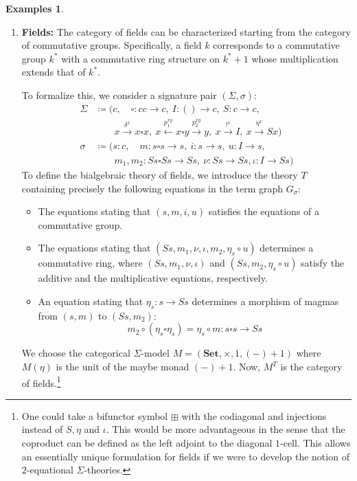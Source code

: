 \documentclass[11pt]{article}
\theoremstyle{plain}
\theoremstyle{definition}
\newtheorem{examples}[theorem]{Examples}
\numberwithin{equation}{section}
\newcommand{\Set}{\mathbf{Set}}
\begin{document}
\begin{examples}
\begin{enumerate}
\item \textbf{Fields:}
    The category of fields can be characterized starting from the category of commutative groups. Specifically, a field $k$ corresponds to a commutative group $k^*$ with a commutative ring structure on $k^*+1$ whose multiplication extends that of $k^*$.

    To formalize this, we consider a signature pair $(\Sigma, \sigma)$:
    \begin{align*}
    \Sigma
    &\coloneqq (c,\quad \square\colon cc\to c,\ I\colon ()\to c,\ S\colon c\to c,\\
    &\quad\quad x\xrightarrow{\delta^x}x\square x, \ x\xleftarrow{p_1^{xy}}x\square y\xrightarrow{p_2^{xy}}y,\ x\xrightarrow{!^x}I,\ x\xrightarrow{\eta^x}Sx)\\
    \sigma 
    &\coloneqq (s \colon c,\quad m\colon s\square s\to s,\ i\colon s\to s,\ u\colon I\to s,\\
    &\quad\quad m_1,m_2\colon Ss\square Ss\to Ss,\ \nu\colon Ss\to Ss,\iota\colon I\to Ss)
    \end{align*}
    To define the bialgebraic theory of fields, we introduce the theory $T$ containing precisely the following equations in the term graph $G_\sigma$:
    \begin{itemize}
        \item The equations stating that $(s, m, i, u)$ satisfies the equations of a commutative group.
        \item The equations stating that $(Ss, m_1, \nu, \iota, m_2, \eta_s \circ u)$ determines a commutative ring, where $(Ss, m_1, \nu, \iota)$ and $(Ss, m_2, \eta_s \circ u)$ satisfy the additive and the multiplicative equations, respectively.
        \item An equation stating that $\eta_s \colon s \to Ss$ determines a morphism of magmas from $(s,m)$ to $(Ss,m_2)$:
        $$
        m_2 \circ (\eta_s \square \eta_s) = \eta_s \circ m \colon s \square s \to Ss
        $$
    \end{itemize}
    We choose the categorical $\Sigma$-model $M = (\Set, \times, 1, (-)+1)$ where $M(\eta)$ is the unit of the maybe monad $(-)+1$. Now, $M^T$ is the category of fields.\footnote{One could take a bifunctor symbol $\boxplus$ with the codiagonal and injections instead of $S, \eta$ and $\iota$. This would be more advantageous in the sense that the coproduct can be defined as the left adjoint to the diagonal $1$-cell. This allows an essentially unique formulation for fields if we were to develop the notion of $2$-equational $\Sigma$-theories.}


\end{enumerate}
\end{examples}
\end{document}
